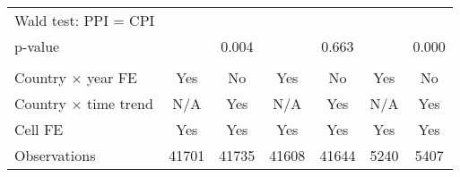 {\begin{tabular}{l*{6}{c}}
Wald test: PPI = CPI&                     &                     &                     &                     &                     &                     \\
\hspace{15pt} p-value&                     &       0.004         &                     &       0.663         &                     &       0.000         \\
\hline \\ Country $\times$ year FE&         Yes         &          No         &         Yes         &          No         &         Yes         &          No         \\
Country $\times$ time trend&         N/A         &         Yes         &         N/A         &         Yes         &         N/A         &         Yes         \\
Cell FE             &         Yes         &         Yes         &         Yes         &         Yes         &         Yes         &         Yes         \\
Observations        &       41701         &       41735         &       41608         &       41644         &        5240         &        5407         \\
\hline\hline
\end{tabular}
}
